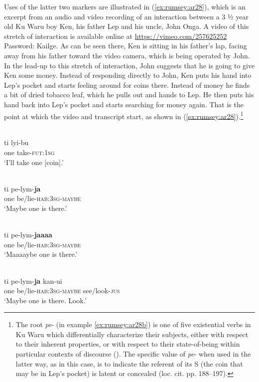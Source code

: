 \documentclass[output=paper]{langsci/langscibook}
\begin{document}
Uses of the latter two markers are illustrated in (\ref{ex:rumsey:ar28}), which is an excerpt from an audio and video recording of an interaction between a 3 ½ year old Ku Waru boy Ken, his father Lep and his uncle, John Onga. A video of this stretch of interaction is available online at \url{https://vimeo.com/257625252} Password: Kailge. As can be seen there, Ken is sitting in his father’s lap, facing away from his father toward the video camera, which is being operated by John. In the lead-up to this stretch of interaction, John suggests that he is going to give Ken some money. Instead of responding directly to John, Ken puts his hand into Lep’s pocket and starts feeling around for coins there. Instead of money he finds a bit of dried tobacco leaf, which he pulls out and hands to Lep. He then puts his hand back into Lep’s pocket and starts searching for money again. That is the point at which the video and transcript start, as shown in (\ref{ex:rumsey:ar28}).\footnote{The root \textit{pe}- (in example \ref{ex:rumsey:ar28b}) is one of five existential verbs in Ku Waru which differentially characterize their subjects, either with respect to their inherent properties, or with respect to their state-of-being within particular contexts of discourse (\citealt{Rumsey2002}). The specific value of \textit{pe}- when used in the latter way, as in this case, is to indicate the referent of its S (the coin that may be in Lep’s pocket) is latent or concealed (loc. cit. pp. 188--197).}


\ea \label{ex:rumsey:ar28}
	\ea \label{ex:rumsey:ar28a}
	\\
	\gll ti lyi-bu\\
	one take-\textsc{fut}:1\textsc{sg}\\
	\glt ‘I’ll take one [coin].’
	
	\ex \label{ex:rumsey:ar28b}
	\\
	\gll ti pe-lym-\textbf{ja}\\
	one be/lie-\textsc{hab}:3\textsc{sg}-\textsc{maybe}\\
	\glt ‘Maybe one is there.’
	
	\ex \label{ex:rumsey:ar28c}
	\\
	\gll ti pe-lym-\textbf{jaaaa}\\
	one be/lie-\textsc{hab}:3\textsc{sg}-\textsc{maybe}\\
	\glt ‘Maaaaybe one is there.’
	
	\ex \label{ex:rumsey:ar28d}
 	\\
	\gll ti pe-lym-\textbf{ja} kan-ui\\
	one be/lie-\textsc{hab}:3\textsc{sg}-\textsc{maybe} see/look-\textsc{jus}\\
	\glt ‘Maybe one is there. Look.’
	
\end{document}
